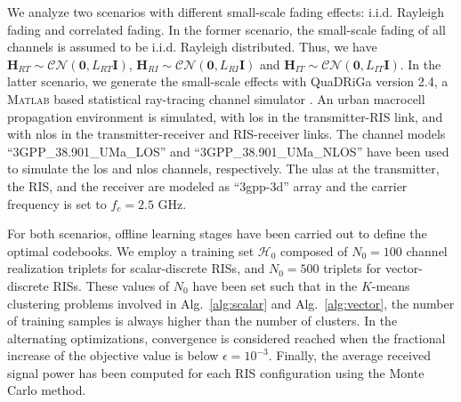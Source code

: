 \documentclass[twocolumn,10pt]{IEEEtran}
\begin{document}
We analyze two scenarios with different small-scale fading effects: i.i.d. Rayleigh fading and correlated fading.
In the former scenario, the small-scale fading of all channels is assumed to be i.i.d. Rayleigh distributed.
Thus, we have $\mathbf{H}_{RT}\sim\mathcal{CN}\left(\boldsymbol{0},L_{RT}\mathbf{I}\right)$, $\mathbf{H}_{RI}\sim\mathcal{CN}\left(\boldsymbol{0},L_{RI}\mathbf{I}\right)$ and $\mathbf{H}_{IT}\sim\mathcal{CN}\left(\boldsymbol{0},L_{IT}\mathbf{I}\right)$.
In the latter scenario, we generate the small-scale effects with QuaDRiGa version 2.4, a \textsc{Matlab} based statistical ray-tracing channel simulator \cite{jae14}.
An urban macrocell propagation environment is simulated, with \gls{los} in the transmitter-RIS link, and with \gls{nlos} in the transmitter-receiver and RIS-receiver links.
The channel models ``3GPP\_38.901\_UMa\_LOS'' and ``3GPP\_38.901\_UMa\_NLOS'' have been used to simulate the \gls{los} and \gls{nlos} channels, respectively.
The \glspl{ula} at the transmitter, the RIS, and the receiver are modeled as ``3gpp-3d'' array and the carrier frequency is set to $f_c=2.5$ GHz.
%

For both scenarios, offline learning stages have been carried out to define the optimal codebooks.
We employ a training set $\mathcal{H}_0$ composed of $N_0=100$ channel realization triplets for scalar-discrete RISs, and $N_0=500$ triplets for vector-discrete RISs.
These values of $N_0$ have been set such that in the $K$-means clustering problems involved in Alg.~\ref{alg:scalar} and Alg.~\ref{alg:vector}, the number of training samples is always higher than the number of clusters.
In the alternating optimizations, convergence is considered reached when the fractional increase of the objective value is below $\epsilon=10^{-3}$.
Finally, the average received signal power has been computed for each RIS configuration using the Monte Carlo method.
\end{document}
